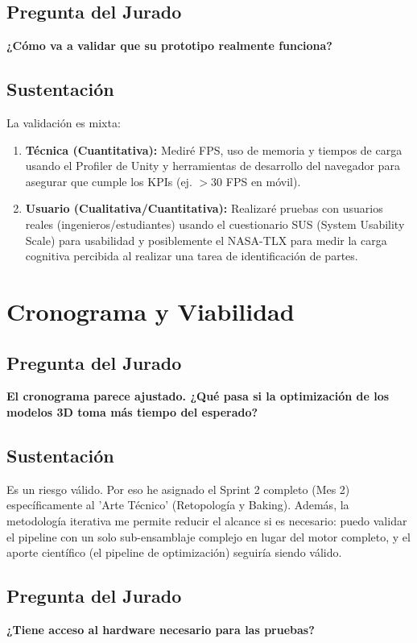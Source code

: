 \documentclass[11pt]{article}
\begin{document}
\subsection*{Pregunta del Jurado}
\textbf{¿Cómo va a validar que su prototipo realmente funciona?}

\subsection*{Sustentación}
La validación es mixta:

\begin{enumerate}
\item \textbf{Técnica (Cuantitativa):} Mediré FPS, uso de memoria y tiempos de carga usando el Profiler de Unity y herramientas de desarrollo del navegador para asegurar que cumple los KPIs (ej. $>$30 FPS en móvil).
\item \textbf{Usuario (Cualitativa/Cuantitativa):} Realizaré pruebas con usuarios reales (ingenieros/estudiantes) usando el cuestionario SUS (System Usability Scale) para usabilidad y posiblemente el NASA-TLX para medir la carga cognitiva percibida al realizar una tarea de identificación de partes.
\end{enumerate}

\section{Cronograma y Viabilidad}

\subsection*{Pregunta del Jurado}
\textbf{El cronograma parece ajustado. ¿Qué pasa si la optimización de los modelos 3D toma más tiempo del esperado?}

\subsection*{Sustentación}
Es un riesgo válido. Por eso he asignado el Sprint 2 completo (Mes 2) específicamente al 'Arte Técnico' (Retopología y Baking). Además, la metodología iterativa me permite reducir el alcance si es necesario: puedo validar el pipeline con un solo sub-ensamblaje complejo en lugar del motor completo, y el aporte científico (el pipeline de optimización) seguiría siendo válido.

\subsection*{Pregunta del Jurado}
\textbf{¿Tiene acceso al hardware necesario para las pruebas?}
\end{document}
